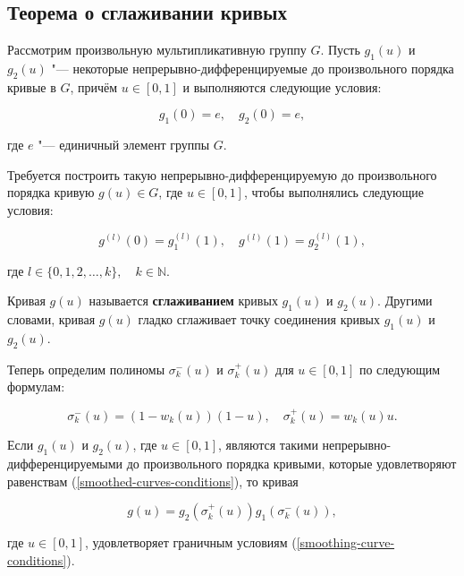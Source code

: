 \subsection*{Теорема о сглаживании кривых}

Рассмотрим произвольную мультипликативную группу $G$. Пусть $g_1(u)$ и $g_2(u)$ "--- некоторые
непрерывно-дифференцируемые до произвольного порядка кривые в $G$, причём $u \in [0,1]$ и выполняются следующие условия:

\begin{equation}
g_1(0)=e, \quad g_2(0)=e,
\label{smoothed-curves-conditions}
\end{equation}

\noindent где $e$ "--- единичный элемент группы $G$.

Требуется построить такую непрерывно-дифференцируемую до произвольного порядка кривую $g(u)\in G$, где $u \in [0,1]$,
чтобы выполнялись следующие условия:

\begin{equation}
g^{(l)}(0)=g_1^{(l)}(1), \quad g^{(l)}(1)=g_2^{(l)}(1),
\label{smoothing-curve-conditions}
\end{equation}

\noindent где $l \in \{0,1,2,\dots,k\},\quad k\in\mathbb{N}$.

\begin{definition}
Кривая $g(u)$ называется \textbf{сглаживанием} кривых $g_1(u)$ и $g_2(u)$. Другими словами, кривая $g(u)$ гладко
сглаживает точку соединения кривых $g_1(u)$ и $g_2(u)$.
\end{definition}

Теперь определим полиномы $\sigma_k^-(u)$ и $\sigma_k^+(u)$ для $u \in [0,1]$ по следующим формулам:

$$
\sigma_k^-(u)=(1-w_k(u))(1-u), \quad \sigma_k^+(u)=w_k(u)u.
$$

\begin{theorem}
Если $g_1(u)$ и $g_2(u)$, где $u \in [0,1]$, являются такими непрерывно-дифференцируемыми до произвольного порядка
кривыми, которые удовлетворяют равенствам (\ref{smoothed-curves-conditions}), то кривая

$$
g(u)=g_2(\sigma_k^+(u))g_1(\sigma_k^-(u)),
$$

\noindent где $u \in [0,1]$, удовлетворяет граничным условиям (\ref{smoothing-curve-conditions}).
\end{theorem}
